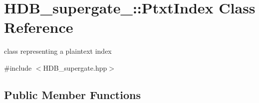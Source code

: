 \hypertarget{classHDB__supergate___1_1PtxtIndex}{}\section{H\+D\+B\+\_\+supergate\+\_\+\+:\+:Ptxt\+Index Class Reference}
\label{classHDB__supergate___1_1PtxtIndex}


class representing a plaintext index  




{\ttfamily \#include $<$H\+D\+B\+\_\+supergate.\+hpp$>$}

\subsection*{Public Member Functions}
